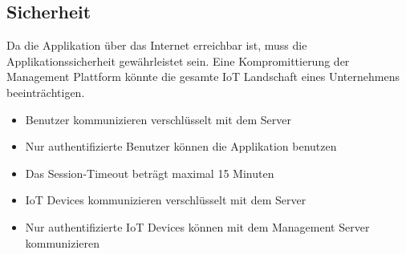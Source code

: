 \subsection{Sicherheit}
Da die Applikation über das Internet erreichbar ist, muss die Applikationssicherheit gewährleistet sein. Eine Kompromittierung der Management Plattform könnte die gesamte IoT Landschaft eines Unternehmens beeinträchtigen.

\begin{itemize}
\item Benutzer kommunizieren verschlüsselt mit dem Server
\item Nur authentifizierte Benutzer können die Applikation benutzen
\item Das Session-Timeout beträgt maximal 15 Minuten
\item IoT Devices kommunizieren verschlüsselt mit dem Server
\item Nur authentifizierte IoT Devices können mit dem Management Server kommunizieren
\end{itemize}